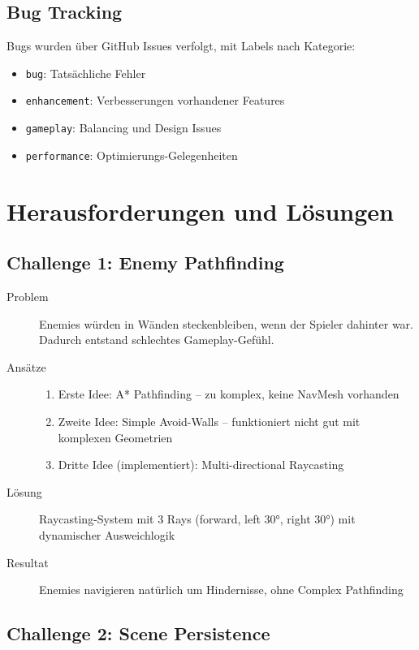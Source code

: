 \documentclass[
  a4paper,
  11pt,
  ngerman,
  parskip=half,
  bibliography=totoc,
  listof=totoc
]{scrreprt}
\begin{document}
\subsection{Bug Tracking}

Bugs wurden über GitHub Issues verfolgt, mit Labels nach Kategorie:
\begin{itemize}
    \item \texttt{bug}: Tatsächliche Fehler
    \item \texttt{enhancement}: Verbesserungen vorhandener Features
    \item \texttt{gameplay}: Balancing und Design Issues
    \item \texttt{performance}: Optimierungs-Gelegenheiten
\end{itemize}

\section{Herausforderungen und Lösungen}

\subsection{Challenge 1: Enemy Pathfinding}

\begin{description}
    \item[Problem] Enemies würden in Wänden steckenbleiben, wenn der Spieler dahinter war. Dadurch entstand schlechtes Gameplay-Gefühl.
    \item[Ansätze]
    \begin{enumerate}
        \item Erste Idee: A* Pathfinding -- zu komplex, keine NavMesh vorhanden
        \item Zweite Idee: Simple Avoid-Walls -- funktioniert nicht gut mit komplexen Geometrien
        \item Dritte Idee (implementiert): Multi-directional Raycasting
    \end{enumerate}
    \item[Lösung] Raycasting-System mit 3 Rays (forward, left 30°, right 30°) mit dynamischer Ausweichlogik
    \item[Resultat] Enemies navigieren natürlich um Hindernisse, ohne Complex Pathfinding
\end{description}

\subsection{Challenge 2: Scene Persistence}
\end{document}
